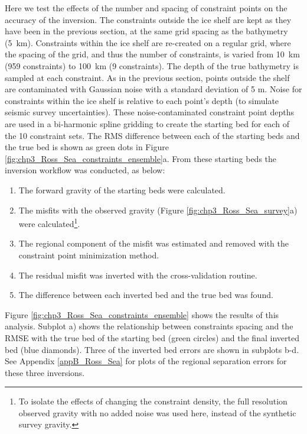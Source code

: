 Here we test the effects of the number and spacing of constraint points on the accuracy of the inversion. The constraints outside the ice shelf are kept as they have been in the previous section, at the same grid spacing as the bathymetry (5~km). Constraints within the ice shelf are re-created on a regular grid, where the spacing of the grid, and thus the number of constraints, is varied from 10~km (959 constraints) to 100~km (9 constraints). The depth of the true bathymetry is sampled at each constraint. As in the previous section, points outside the shelf are contaminated with Gaussian noise with a standard deviation of 5 m. Noise for constraints within the ice shelf is relative to each point's depth (to simulate seismic survey uncertainties). These  noise-contaminated constraint point depths are used in a bi-harmonic spline gridding to create the starting bed for each of the 10 constraint sets. The RMS difference between each of the starting beds and the true bed is shown as green dots in Figure \ref{fig:chp3_Ross_Sea_constraints_ensemble}a. From these starting beds the inversion workflow was conducted, as below:

\begin{enumerate}
    \item The forward gravity of the starting beds were calculated.
    \item The misfits with the observed gravity (Figure \ref{fig:chp3_Ross_Sea_survey}a) were calculated\footnote{To isolate the effects of changing the constraint density, the full resolution observed gravity with no added noise was used here, instead of the synthetic survey gravity.}.
    \item The regional component of the misfit was estimated and removed with the constraint point minimization method.
    \item The residual misfit was inverted with the cross-validation routine.
    \item The difference between each inverted bed and the true bed was found.
\end{enumerate}

Figure \ref{fig:chp3_Ross_Sea_constraints_ensemble} shows the results of this analysis. Subplot a) shows the relationship between constraints spacing and the RMSE with the true bed of the starting bed (green circles) and the final inverted bed (blue diamonds). Three of the inverted bed errors are shown in subplots b-d. See Appendix \ref{appB_Ross_Sea} for plots of the regional separation errors for these three inversions. 


